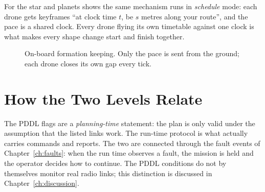 \documentclass[11pt,a4paper,oneside]{report}
\begin{document}
For the star and planets shows the same mechanism runs in \emph{schedule} mode: each drone gets
keyframes ``at clock time $t$, be $s$ metres along your route'', and the pace is a shared clock.
Every drone flying its own timetable against one clock is what makes every shape change start and
finish together.

\begin{figure}[H]
\centering
{}
\caption{On-board formation keeping. Only the pace is sent from the ground; each drone closes its
own gap every tick.}
\label{fig:pace}
\end{figure}

\section{How the Two Levels Relate}
The PDDL flags are a \emph{planning-time} statement: the plan is only valid under the assumption
that the listed links work. The run-time protocol is what actually carries commands and reports.
The two are connected through the fault events of Chapter~\ref{ch:faults}: when the run time
observes a fault, the mission is held and the operator decides how to continue. The PDDL
conditions do not by themselves monitor real radio links; this distinction is discussed in
Chapter~\ref{ch:discussion}.

\end{document}

